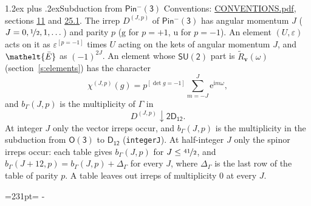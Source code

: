 \documentclass[10pt,a4paper]{article}
\makeatletter
\renewcommand\section{\@startsection{section}{1}{\z@}{-3ex plus -1ex minus -.2ex}%
  {1.2ex plus .2ex}{\normalfont\large\sffamily\bfseries\color{parttitle}}}
\newcommand{\needspace}[1]{\par\penalty-100\begingroup\dimen0=#1\relax\dimen2=\pagegoal
  \advance\dimen2-\pagetotal\ifdim\dimen0>\dimen2\relax\ifdim\dimen2>0pt\vfil\break\fi\fi
  \endgroup}
\numberwithin{equation}{section}
\newcommand{\eltfont}[1]{{\let\sigma\eltsigma\mathelt{#1}}}
\newcommand{\grp}[1]{\mathsf{#1}}
\newcommand{\elt}[1]{\eltfont{#1}}
\newcommand{\ptag}[1]{\mathrm{#1}}
\newcommand{\iverson}[1]{[#1]}
\newcommand{\restr}[2]{#1\!\downarrow#2}
\newcommand{\vv}{\mathbf{v}}
\newcommand{\iunit}{\mathrm{i}}
\newcommand{\expe}{\mathrm{e}}
\newcommand{\irrJp}[2]{D^{(#1,#2)}}
\newcommand{\barred}[1]{\bar{#1}}
\newcommand{\lift}[1]{\tilde{#1}}
\makeatother
\begin{document}
\section{Subduction from \texorpdfstring{$\grp{Pin^{-}(3)}$}{Pin(3)}}\label{s:subduction_parent}
Conventions: \href{../../CONVENTIONS.pdf}{CONVENTIONS.pdf}, sections \href{../../../rotation/CONVENTIONS.pdf\#conv.11}{11} and \href{../../CONVENTIONS.pdf\#conv.25.1}{25.1}.
\leavevmode\label{n:index.J}\label{n:index.parity}\label{n:irrep.o3}The irrep $\irrJp{J}{p}$ of \href{Pinminus3.pdf}{$\grp{Pin^{-}(3)}$} has angular momentum $J$ ($J = 0, \nicefrac{1}{2}, 1, \dots$) and parity $p$ ($\ptag{g}$ for $p = +1$, $\ptag{u}$ for $p = -1$). An element $(U, \varepsilon)$ acts on it as $\varepsilon^{[p = -1]}$ times $U$ acting on the kets of angular momentum $J$, and $\elt{\barred{E}}$ as $(-1)^{2J}$. \label{n:function.character.parent}\label{n:function.multiplicity}An element whose $\grp{SU(2)}$ part is $\lift{R}_{\vv}(\omega)$ (section~\ref{s:elements}) has the character
\begin{equation}\label{e:chi}\chi^{(J,p)}(g) = p^{\iverson{\det g = -1}}\sum_{m=-J}^{J} \expe^{\iunit m\omega},\end{equation}
and $b_\Gamma(J, p)$ is the multiplicity of $\Gamma$ in
\begin{equation}\label{e:parent}\restr{\irrJp{J}{p}}{\grp{2D_{12}}}.\end{equation}
At integer $J$ only the vector irreps occur, and $b_\Gamma(J, p)$ is the multiplicity in the subduction from $\grp{O(3)}$ to \href{../../../rotation/data/pdf/D12.pdf}{$\grp{D_{12}}$} (\texttt{integerJ}). \label{n:index.increment}At half-integer $J$ only the spinor irreps occur: each table gives $b_\Gamma(J, p)$ for $J \le \nicefrac{41}{2}$, and $b_\Gamma(J + 12, p) = b_\Gamma(J, p) + \Delta_\Gamma$ for every $J$, where $\Delta_\Gamma$ is the last row of the table of parity $p$. A table leaves out irreps of multiplicity 0 at every $J$.
\needspace{231pt}
\end{document}
